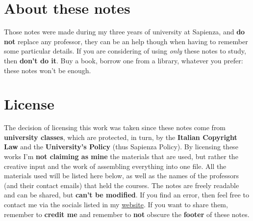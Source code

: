 \vspace{12pt}
\section*{About these notes}

Those notes were made during my three years of university at Sapienza, and \textbf{do not} replace any professor, they can be an help though when having to remember some particular details. If you are considering of using \textit{only} these notes to study, then \textbf{don't do it}. Buy a book, borrow one from a library, whatever you prefer: these notes won't be enough.

\vspace{32pt}
\section*{License}

The decision of licensing this work was taken since these notes come from \textbf{university classes}, which are protected, in turn, by the \textbf{Italian Copyright Law} and the \textbf{University's Policy} (thus Sapienza Policy). By licensing these works I'm \textbf{not claiming as mine} the materials that are used, but rather the creative input and the work of assembling everything into one file.
\nl
All the materials used will be listed here below, as well as the names of the professors (and their contact emails) that held the courses.
\nl
The notes are freely readable and can be shared, but \textbf{can't be modified}. If you find an error, then feel free to contact me via the socials listed in my \href{https://www.leonardobiason.com}{website}. If you want to share them, remember to \textbf{credit me} and remember to \textbf{not} obscure the \textbf{footer} of these notes.

\vspace{32pt}
% 
%     

